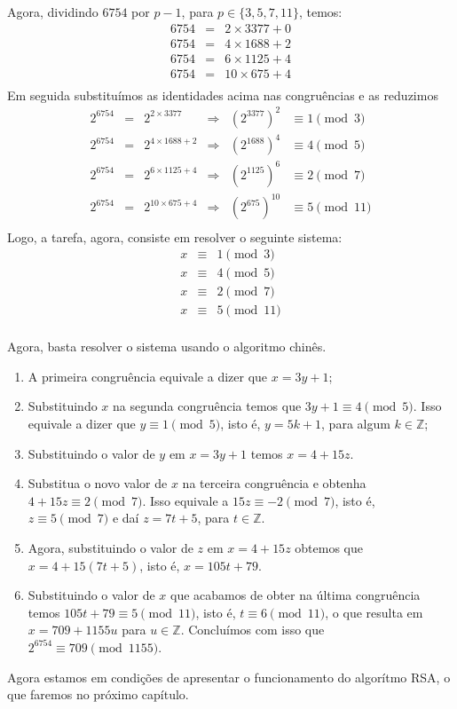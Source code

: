 Agora, dividindo $6754$ por $p-1$, para $p\in\{3, 5, 7, 11\}$, temos:
\[
\begin{array}{ccl}
  6754 & = & 2 \times 3377 + 0 \\  
	6754 & = & 4 \times 1688 + 2 \\
  6754 & = & 6 \times 1125 + 4 \\
  6754 & = & 10 \times 675 + 4 \\ 
\end{array}
\]
Em seguida substitu\'imos as identidades acima nas congru\^encias e as reduzimos
\[
\begin{array}{cccccc}
2^{6754} & = & 2^{2\times 3377}   & \Rightarrow & (2^{3377})^{2} & \equiv 1 \pmod{3} \\  
2^{6754} & = & 2^{4\times 1688+2} & \Rightarrow & (2^{1688})^{4} & \equiv 4 \pmod{5}\\  
2^{6754} & = & 2^{6\times 1125+4} & \Rightarrow & (2^{1125})^{6} & \equiv 2 \pmod{7}\\ 
2^{6754} & = & 2^{10\times 675+4} & \Rightarrow & (2^{675})^{10} & \equiv 5 \pmod{11}\\  
\end{array}
\]
Logo, a tarefa, agora, consiste em resolver o seguinte sistema:
\[
\begin{array}{ccc}
  x & \equiv & 1 \pmod{3}\\
  x & \equiv & 4 \pmod{5}\\
  x & \equiv & 2 \pmod{7}\\
  x & \equiv & 5 \pmod{11}\\  
\end{array}
\]

Agora, basta resolver o sistema usando o algoritmo chin\^{e}s. 
\begin{enumerate}
\item A primeira congru\^{e}ncia equivale a dizer que $x = 3y + 1$; 
\item Substituindo $x$ na segunda congru\^encia temos que $3y + 1 \equiv 4 \pmod{5}$. Isso equivale a dizer que $y \equiv 1 \pmod{5}$, 
isto \'{e}, $y=5k+1$, para algum $k\in\mathbb{Z}$; 
\item Substituindo o valor de $y$ em $x=3y+1$ temos $x=4+15z$.
\item Substitua o novo valor de $x$ na terceira congru\^{e}ncia e obtenha $4+15z\equiv 2\pmod{7}$. Isso equivale a
      $15z\equiv -2\pmod{7}$, isto \'{e}, $z\equiv 5\pmod{7}$ e da\'{i} $z=7t+5$, para $t\in\mathbb{Z}$.
\item Agora, substituindo o valor de $z$ em $x=4+15z$ obtemos que $x=4+15(7t+5)$, isto \'{e}, $x=105t+79$.
\item Substituindo o valor de $x$ que acabamos de obter na \'{u}ltima congru\^{e}ncia temos 
      $105t+79\equiv 5 \pmod{11}$, isto \'{e},  $t\equiv 6 \pmod{11}$, o que resulta em 
				$x = 709+1155u$ para $u\in\mathbb{Z}$. Conclu\'imos com isso que $2^{6754} \equiv 709 \pmod{1155}$.
\end{enumerate}

Agora estamos em condi\c{c}\~{o}es de apresentar o funcionamento do algor\'{i}tmo RSA, o que faremos no pr\'{o}ximo cap\'{i}tulo. 